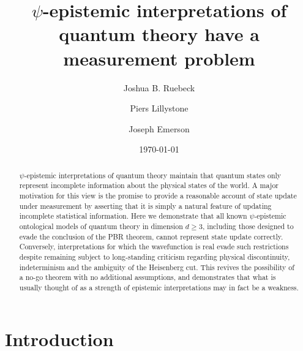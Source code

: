 \documentclass[%
 reprint,
superscriptaddress,
nofootinbib,
 amsmath,amssymb,
 prx, 
 accepted=2019-09-27,
]{quantumarticle}
\begin{document}
\title{$\psi$-epistemic interpretations of quantum theory have a measurement problem}%

\author{Joshua B. Ruebeck}
\author{Piers Lillystone}
%
\author{Joseph Emerson}
\date{\today} 


\begin{abstract}
  $\psi$-epistemic interpretations of quantum theory maintain that
  quantum states only represent incomplete information about the
  physical states of the world.  A major motivation for this view is
  the promise to provide a reasonable account of state update under
  measurement by asserting that it is simply a natural feature of
  updating incomplete statistical information.  Here we demonstrate
  that all known $\psi$-epistemic ontological models of quantum theory
  in dimension $d\geq3$, including those designed to evade the 
  conclusion of the PBR theorem, cannot represent state update
  correctly. Conversely, interpretations for which the wavefunction is
  real evade such restrictions despite remaining subject to
  long-standing criticism regarding physical discontinuity,
  indeterminism and the ambiguity of the Heisenberg cut. This revives
  the possibility of a no-go theorem with no additional assumptions,
  and demonstrates that what is usually thought of as a strength of
  epistemic interpretations may in fact be a weakness.
\end{abstract}

\maketitle

 
 
\section{Introduction}
\label{sec:introduction}
\end{document}
